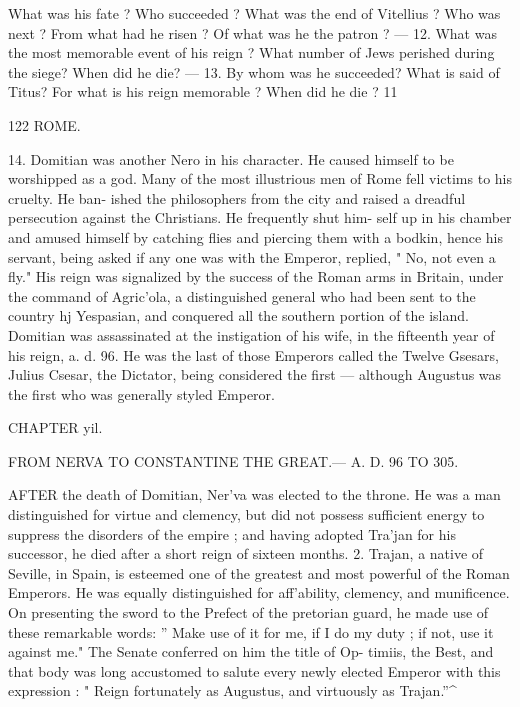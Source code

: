 \documentclass[openany,a4paper]{memoir}
\begin{document}
What was his fate ? Who succeeded ? What was the end of Vitellius ? 
Who was next ? From what had he risen ? Of what was he the patron ? 
— 12. What was the most memorable event of his reign ? What number 
of Jews perished during the siege? When did he die? — 13. By whom 
was he succeeded? What is said of Titus? For what is his reign 
memorable ? When did he die ? 
11 



122 ROME. 

14. Domitian was another Nero in his character. He 
caused himself to be worshipped as a god. Many of the most 
illustrious men of Rome fell victims to his cruelty. He ban- 
ished the philosophers from the city and raised a dreadful 
persecution against the Christians. He frequently shut him- 
self up in his chamber and amused himself by catching flies 
and piercing them with a bodkin, hence his servant, being 
asked if any one was with the Emperor, replied, " No, not 
even a fly." His reign was signalized by the success of the 
Roman arms in Britain, under the command of Agric'ola, a 
distinguished general who had been sent to the country hj 
Yespasian, and conquered all the southern portion of the 
island. Domitian was assassinated at the instigation of his 
wife, in the fifteenth year of his reign, a. d. 96. He was the 
last of those Emperors called the Twelve Gsesars, Julius 
Csesar, the Dictator, being considered the first — although 
Augustus was the first who was generally styled Emperor. 



CHAPTER yil. 

FROM NERVA TO CONSTANTINE THE GREAT.— A. D. 96 TO 305. 

AFTER the death of Domitian, Ner'va was elected to the 
throne. He was a man distinguished for virtue and 
clemency, but did not possess sufficient energy to suppress 
the disorders of the empire ; and having adopted Tra'jan 
for his successor, he died after a short reign of sixteen months. 
2. Trajan, a native of Seville, in Spain, is esteemed one 
of the greatest and most powerful of the Roman Emperors. 
He was equally distinguished for aff'ability, clemency, and 
munificence. On presenting the sword to the Prefect of the 
pretorian guard, he made use of these remarkable words: 
'' Make use of it for me, if I do my duty ; if not, use it 
against me." The Senate conferred on him the title of Op- 
timiis, the Best, and that body was long accustomed to salute 
every newly elected Emperor with this expression : " Reign 
fortunately as Augustus, and virtuously as Trajan.''^ 
\end{document}
